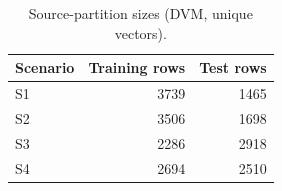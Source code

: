 \begin{table}[htbp]
\centering\small
\caption{Source-partition sizes (DVM, unique vectors).}\label{tab:rev_sources}
\begin{tabular}{lrr}
\hline
Scenario & Training rows & Test rows \\ \hline
S1 & 3739 & 1465 \\
S2 & 3506 & 1698 \\
S3 & 2286 & 2918 \\
S4 & 2694 & 2510 \\
\hline
\end{tabular}
\end{table}
